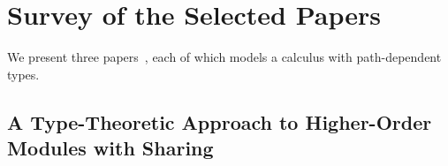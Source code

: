 \documentclass[10pt,journal,a4paper]{IEEEtran}
\begin{document}
%





\section{Survey of the Selected Papers}%

We present three papers~\cite{nuObj,tribe,homl}, each of which models a
calculus with path-dependent types.


\subsection{A Type-Theoretic Approach to Higher-Order Modules with Sharing}
\end{document}
